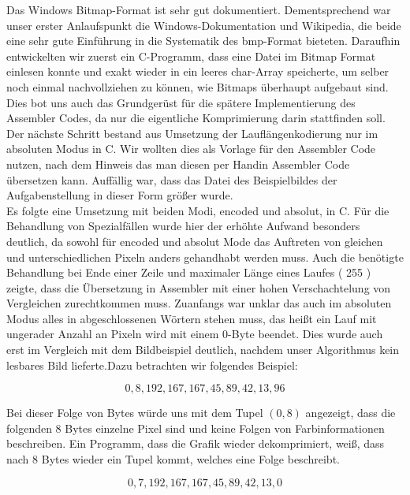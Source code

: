 \documentclass[11pt]{scrartcl}
\begin{document}
Das Windows Bitmap-Format ist sehr gut dokumentiert. Dementsprechend war unser erster Anlaufspunkt die Windows-Dokumentation und Wikipedia, die beide eine sehr gute Einführung in die Systematik des bmp-Format bieteten. Daraufhin entwickelten wir zuerst ein C-Programm, dass eine Datei im Bitmap Format einlesen konnte und exakt wieder in ein leeres char-Array speicherte, um selber noch einmal nachvollziehen zu können, wie Bitmaps überhaupt aufgebaut sind. Dies bot uns auch das Grundgerüst für die spätere Implementierung des Assembler Codes, da nur die eigentliche Komprimierung darin stattfinden soll.\\
Der nächste Schritt bestand aus Umsetzung der Lauflängenkodierung nur im absoluten Modus in C. Wir wollten dies als Vorlage für den Assembler Code nutzen, nach dem Hinweis das man diesen \glqq per Hand\grqq in Assembler Code übersetzen kann. Auffällig war, dass das Datei des Beispielbildes der Aufgabenstellung in dieser Form größer wurde.\\
Es folgte eine Umsetzung mit beiden Modi, encoded und absolut, in C. Für die Behandlung von Spezialfällen wurde hier der erhöhte Aufwand besonders deutlich, da sowohl für encoded und absolut Mode das Auftreten von gleichen und unterschiedlichen Pixeln anders gehandhabt werden muss. Auch die benötigte Behandlung bei Ende einer Zeile und maximaler Länge eines Laufes ( 255 ) zeigte, dass die Übersetzung in Assembler mit einer hohen Verschachtelung von Vergleichen zurechtkommen muss. Zuanfangs war unklar das auch im absoluten Modus alles in abgeschlossenen Wörtern stehen muss, das heißt ein Lauf mit ungerader Anzahl an Pixeln wird mit einem 0-Byte beendet. Dies wurde auch erst im Vergleich mit dem Bildbeispiel deutlich, nachdem unser Algorithmus kein lesbares Bild lieferte.Dazu betrachten wir folgendes Beispiel:

$$0, 8, 192, 167, 167, 45, 89, 42, 13, 96$$

Bei dieser Folge von Bytes würde uns mit dem Tupel $(0,8)$ angezeigt, dass die folgenden 8 Bytes einzelne Pixel sind und keine Folgen von Farbinformationen beschreiben. Ein Programm, dass die Grafik wieder dekomprimiert, weiß, dass nach 8 Bytes wieder ein Tupel kommt, welches eine Folge beschreibt.

$$0, 7, 192, 167, 167, 45, 89, 42, 13, 0$$
\end{document}
